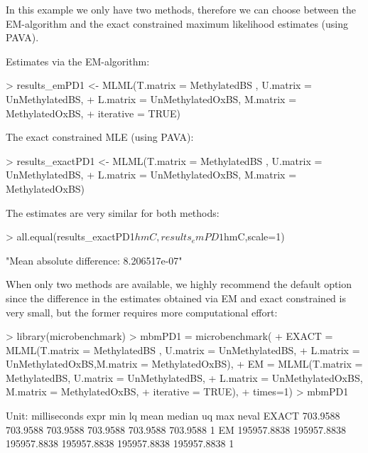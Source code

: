 \documentclass{article}
\begin{document}
In this example we only have two methods, therefore we can choose between the EM-algorithm and the exact constrained maximum likelihood estimates (using PAVA).

Estimates via the EM-algorithm:

\begin{Schunk}
\begin{Sinput}
> results_emPD1 <- MLML(T.matrix = MethylatedBS , U.matrix = UnMethylatedBS,
+                    L.matrix = UnMethylatedOxBS, M.matrix = MethylatedOxBS,
+                    iterative = TRUE)
\end{Sinput}
\end{Schunk}


The exact constrained MLE (using PAVA):

\begin{Schunk}
\begin{Sinput}
> results_exactPD1 <- MLML(T.matrix = MethylatedBS , U.matrix = UnMethylatedBS,
+                       L.matrix = UnMethylatedOxBS, M.matrix = MethylatedOxBS)
\end{Sinput}
\end{Schunk}

The estimates are very similar for both methods:
\begin{Schunk}
\begin{Sinput}
> all.equal(results_exactPD1$hmC,results_emPD1$hmC,scale=1)
\end{Sinput}
\begin{Soutput}
[1] "Mean absolute difference: 8.206517e-07"
\end{Soutput}
\end{Schunk}

When only two methods are available, we highly recommend the default option  since the difference in the estimates obtained via EM and exact constrained is very small, but the former requires more computational effort:

\begin{Schunk}
\begin{Sinput}
> library(microbenchmark)
> mbmPD1 = microbenchmark(
+   EXACT = MLML(T.matrix = MethylatedBS , U.matrix = UnMethylatedBS,
+                L.matrix = UnMethylatedOxBS,M.matrix = MethylatedOxBS),
+   EM = MLML(T.matrix = MethylatedBS, U.matrix = UnMethylatedBS,
+             L.matrix = UnMethylatedOxBS, M.matrix = MethylatedOxBS,
+             iterative = TRUE),
+   times=1)
> mbmPD1
\end{Sinput}
\begin{Soutput}
Unit: milliseconds
  expr         min          lq        mean      median          uq         max neval
 EXACT    703.9588    703.9588    703.9588    703.9588    703.9588    703.9588     1
    EM 195957.8838 195957.8838 195957.8838 195957.8838 195957.8838 195957.8838     1
\end{Soutput}
\end{Schunk}
\end{document}
